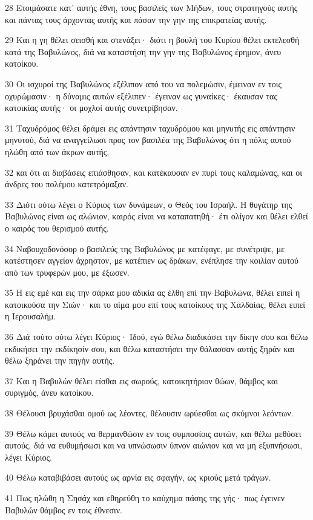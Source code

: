 \par 28 Ετοιμάσατε κατ' αυτής έθνη, τους βασιλείς των Μήδων, τους στρατηγούς αυτής και πάντας τους άρχοντας αυτής και πάσαν την γην της επικρατείας αυτής.
\par 29 Και η γη θέλει σεισθή και στενάξει· διότι η βουλή του Κυρίου θέλει εκτελεσθή κατά της Βαβυλώνος, διά να καταστήση την γην της Βαβυλώνος έρημον, άνευ κατοίκου.
\par 30 Οι ισχυροί της Βαβυλώνος εξέλιπον από του να πολεμώσιν, έμειναν εν τοις οχυρώμασιν· η δύναμις αυτών εξέλιπεν· έγειναν ως γυναίκες· έκαυσαν τας κατοικίας αυτής· οι μοχλοί αυτής συνετρίβησαν.
\par 31 Ταχυδρόμος θέλει δράμει εις απάντησιν ταχυδρόμου και μηνυτής εις απάντησιν μηνυτού, διά να αναγγείλωσι προς τον βασιλέα της Βαβυλώνος ότι η πόλις αυτού ηλώθη από των άκρων αυτής,
\par 32 και ότι αι διαβάσεις επιάσθησαν, και κατέκαυσαν εν πυρί τους καλαμώνας, και οι άνδρες του πολέμου κατετρόμαξαν.
\par 33 Διότι ούτω λέγει ο Κύριος των δυνάμεων, ο Θεός του Ισραήλ. Η θυγάτηρ της Βαβυλώνος είναι ως αλώνιον, καιρός είναι να καταπατηθή· έτι ολίγον και θέλει ελθεί ο καιρός του θερισμού αυτής.
\par 34 Ναβουχοδονόσορ ο βασιλεύς της Βαβυλώνος με κατέφαγε, με συνέτριψε, με κατέστησεν αγγείον άχρηστον, με κατέπιεν ως δράκων, ενέπλησε την κοιλίαν αυτού από των τρυφερών μου, με έξωσεν.
\par 35 Η εις εμέ και εις την σάρκα μου αδικία ας έλθη επί την Βαβυλώνα, θέλει ειπεί η κατοικούσα την Σιών· και το αίμα μου επί τους κατοίκους της Χαλδαίας, θέλει ειπεί η Ιερουσαλήμ.
\par 36 Διά τούτο ούτω λέγει Κύριος· Ιδού, εγώ θέλω διαδικάσει την δίκην σου και θέλω εκδικήσει την εκδίκησίν σου, και θέλω καταστήσει την θάλασσαν αυτής ξηράν και θέλω ξηράνει την πηγήν αυτής.
\par 37 Και η Βαβυλών θέλει είσθαι εις σωρούς, κατοικητήριον θώων, θάμβος και συριγμός, άνευ κατοίκου.
\par 38 Θέλουσι βρυχάσθαι ομού ως λέοντες, θέλουσιν ωρύεσθαι ως σκύμνοι λεόντων.
\par 39 Θέλω κάμει αυτούς να θερμανθώσιν εν τοις συμποσίοις αυτών, και θέλω μεθύσει αυτούς, διά να ευθυμήσωσι και να υπνώσωσιν ύπνον αιώνιον και να μη εξυπνήσωσι, λέγει Κύριος.
\par 40 Θέλω καταβιβάσει αυτούς ως αρνία εις σφαγήν, ως κριούς μετά τράγων.
\par 41 Πως ηλώθη η Σησάχ και εθηρεύθη το καύχημα πάσης της γής· πως έγεινεν Βαβυλών θάμβος εν τοις έθνεσιν.
